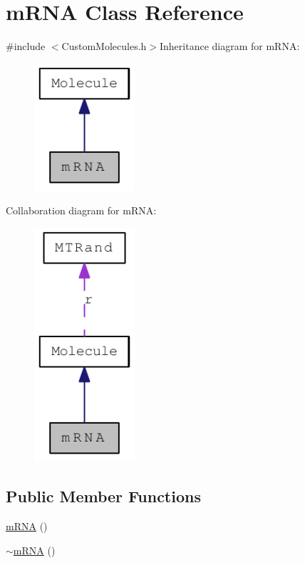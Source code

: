 \hypertarget{classmRNA}{
\section{mRNA Class Reference}
\label{classmRNA}
}


{\ttfamily \#include $<$CustomMolecules.h$>$}Inheritance diagram for mRNA:\nopagebreak
\begin{figure}[H]
\begin{center}
\leavevmode
\includegraphics[width=106pt]{classmRNA__inherit__graph}
\end{center}
\end{figure}
Collaboration diagram for mRNA:\nopagebreak
\begin{figure}[H]
\begin{center}
\leavevmode
\includegraphics[width=106pt]{classmRNA__coll__graph}
\end{center}
\end{figure}
\subsection*{Public Member Functions}
\begin{DoxyCompactItemize}
\item 
\hyperlink{classmRNA_add6fc6ce355527cdab338afb3c9a118f}{mRNA} ()
\item 
\hyperlink{classmRNA_a31f5c877c9941cee8d9f991c8e40b8ec}{$\sim$mRNA} ()
\end{DoxyCompactItemize}


